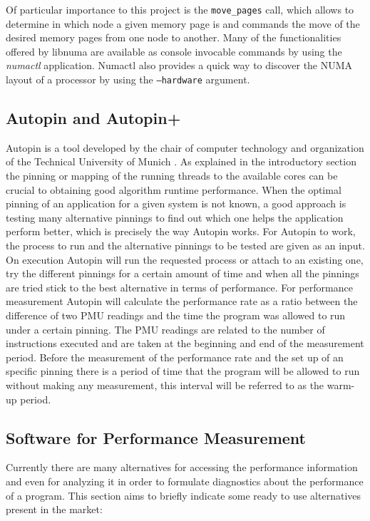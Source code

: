 Of particular importance to this project is the \texttt{move\_pages} call, which allows to determine in which node a given memory page is and commands the move of the desired memory pages from one node to another. Many of the functionalities offered by libnuma are available as console invocable commands by using the \textit{numactl} application. Numactl also provides a quick way to discover the NUMA layout of a processor by using the \texttt{--hardware} argument.

\subsection{Autopin and Autopin+}\label{subsection:autopin2}
Autopin is a tool developed by the chair of computer technology and organization of the Technical University of Munich \cite{autopin}. As explained in the introductory section the pinning or mapping of the running threads to the available cores can be crucial to obtaining good algorithm runtime performance. When the optimal pinning of an application for a given system is not known, a good approach is testing many alternative pinnings to find out which one helps the application perform better, which is precisely the way Autopin works.
For Autopin to work, the process to run and the alternative pinnings to be tested are given as an input. On execution Autopin will run the requested process or attach to an existing one, try the different pinnings for a certain amount of time and when all the pinnings are tried stick to the best alternative in terms of performance. For performance measurement Autopin will calculate the performance rate as a ratio between the difference of two PMU readings and the time the program was allowed to run under a certain pinning. The PMU readings are related to the number of instructions executed and are taken at the beginning and end of the measurement period. Before the measurement of the performance rate and the set up of an specific pinning there is a period of time that the program will be allowed to run without making any measurement, this interval will be referred to as the warm-up period.

\subsection{Software for Performance Measurement }\label{subsection:software-pm}

Currently there are many alternatives for accessing the performance information and even for analyzing it in order to formulate diagnostics about the performance of a program. This section aims to briefly indicate some ready to use alternatives present in the market:

